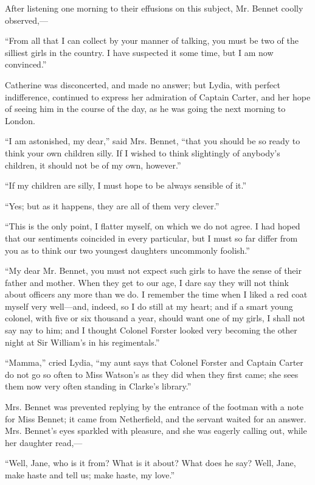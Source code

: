 \documentclass[12pt,openright]{book}
\begin{document}
After listening one morning to their effusions on this subject, Mr. Bennet coolly observed,—

“From all that I can collect by your manner of talking, you must be two of the silliest girls in the country. I have suspected it some time, but I am now convinced.”

Catherine was disconcerted, and made no answer; but Lydia, with perfect indifference, continued to express her admiration of Captain Carter, and her hope of seeing him in the course of the day, as he was going the next morning to London.

“I am astonished, my dear,” said Mrs. Bennet, “that you should be so ready to think your own children silly. If I wished to think slightingly of anybody’s children, it should not be of my own, however.”

“If my children are silly, I must hope to be always sensible of it.”

“Yes; but as it happens, they are all of them very clever.”

“This is the only point, I flatter myself, on which we do not agree. I had hoped that our sentiments coincided in every particular, but I must so far differ from you as to think our two youngest daughters uncommonly foolish.”

“My dear Mr. Bennet, you must not expect such girls to have the sense of their father and mother. When they get to our age, I dare say they will not think about officers any more than we do. I remember the time when I liked a red coat myself very well—and, indeed, so I do still at my heart; and if a smart young colonel, with five or six thousand a year, should want one of my girls, I shall not say nay to him; and I thought Colonel Forster looked very becoming the other night at Sir William’s in his regimentals.”

“Mamma,” cried Lydia, “my aunt says that Colonel Forster and Captain Carter do not go so often to Miss Watson’s as they did when they first came; she sees them now very often standing in Clarke’s library.”

Mrs. Bennet was prevented replying by the entrance of the footman with a note for Miss Bennet; it came from Netherfield, and the servant waited for an answer. Mrs. Bennet’s eyes sparkled with pleasure, and she was eagerly calling out, while her daughter read,—

“Well, Jane, who is it from? What is it about? What does he say? Well, Jane, make haste and tell us; make haste, my love.”
\end{document}
